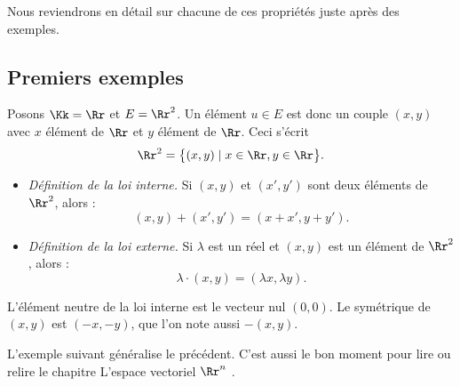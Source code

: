 \documentclass[class=report,crop=false]{standalone}
\begin{document}
Nous reviendrons en détail sur chacune de ces propriétés juste après des exemples.

\subsection{Premiers exemples}

\begin{exemple}
  Posons $\Kk=\Rr$ et $E=\Rr^2$.
  Un élément $u\in E$ est donc un
  couple $(x,y)$ avec $x$ élément de $\Rr$ et $y$ élément de $\Rr$. Ceci s'écrit
  $$\Rr^2=\big\{(x,y)\mid x \in \Rr, y \in \Rr\big\}.$$

  \begin{itemize}
    \item \emph{Définition de la loi interne.}
    Si $(x,y)$ et $(x',y')$ sont deux éléments de $\Rr^2$, alors :
  $$(x,y)+(x',y')=(x+x',y+y').$$

    \item \emph{Définition  de la loi externe.}
    Si $\lambda$ est un réel et $(x,y)$ est un élément de $\Rr^2$, alors :
  $$\lambda \cdot (x,y)=(\lambda x, \lambda y).$$
  \end{itemize}

  L'élément neutre de la loi interne est le vecteur nul $(0,0)$.
  Le symétrique de $(x,y)$ est $(-x,-y)$, que l'on note aussi $-(x,y)$.


\end{exemple}

L'exemple suivant généralise le précédent. C'est aussi le bon moment pour lire ou relire
le chapitre \og L'espace vectoriel $\Rr^n$ \fg.
\end{document}
